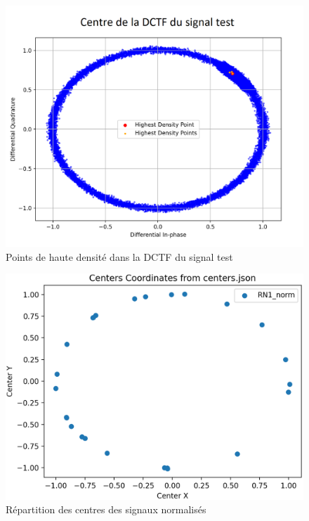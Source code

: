 \newpage

\begin{figure}[h]
\centering

\includegraphics[scale=0.3]{images/dctf6.png}
\caption{Points de haute densité dans la DCTF du signal test}\label{term319}
\end{figure}

\begin{figure}[h]
\centering

\includegraphics[scale=0.3]{images/cluster.png}
\caption{Répartition des centres des signaux normalisés}\label{term320}
\end{figure}


